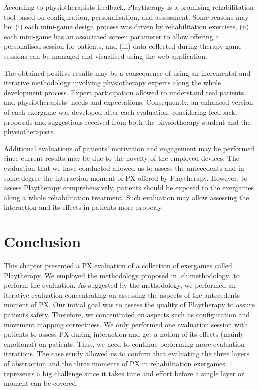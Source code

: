 According to physiotherapists feedback, Playtherapy is a promising rehabilitation tool based on configuration, personalisation, and assessment. Some reasons may be: (i) each mini-game design process was driven by rehabilitation exercises, (ii) each mini-game has an associated screen parameter to allow offering a personalised session for patients, and (iii) data collected during therapy game sessions can be managed and visualised using the web application.

The obtained positive results may be a consequence of using an incremental and iterative methodology involving physiotherapy experts along the whole development process. Expert participation allowed to understand real patients and physiotherapists' needs and expectations. Consequently, an enhanced version of each exergame was developed after each evaluation, considering feedback, proposals and suggestions received from both the physiotherapy student and the physiotherapists. 

Additional evaluations of patients' motivation and engagement may be performed since current results may be due to the novelty of the employed devices. The evaluation that we have conducted allowed us to assess the antecedents and in some degree the interaction moment of \ac{PX} offered by Playtherapy. However, to assess Playtherapy comprehensively, patients should be exposed to the exergames along a whole rehabilitation treatment. Such evaluation may allow assessing the interaction and its effects in patients more properly.

\section{Conclusion}
This chapter presented a \ac{PX} evaluation of a collection of exergames called Playtherapy. We employed the methodology proposed in \autoref{ch:methodology} to perform the evaluation. As suggested by the methodology, we performed an iterative evaluation concentrating on assessing the aspects of the antecedents moment of \ac{PX}. Our initial goal was to assess the quality of Playtherapy to assure patients safety. Therefore, we concentrated on aspects such us configuration and movement mapping correctness. We only performed one evaluation session with patients to assess \ac{PX} during interaction and get a notion of its effects (mainly emotional) on patients. Thus, we need to continue performing more evaluation iterations. The case study allowed us to confirm that evaluating the three layers of abstraction and the three moments of \ac{PX} in rehabilitation exergames represents a big challenge since it takes time and effort before a single layer or moment can be covered.